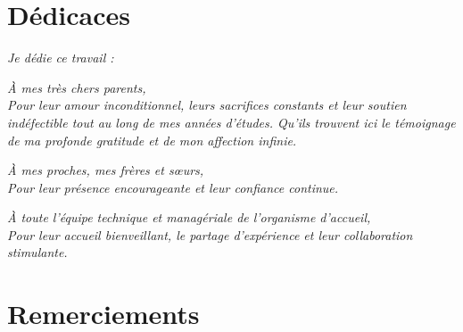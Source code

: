 
\chapter*{Dédicaces}
\thispagestyle{empty}

\begin{center}
  \large
  \textit{Je dédie ce travail :}
\end{center}

\vspace{1cm}

\begin{center}
  \textit{À mes très chers parents,}\\
  \textit{Pour leur amour inconditionnel, leurs sacrifices constants et leur soutien indéfectible tout au long de mes années d'études. Qu'ils trouvent ici le témoignage de ma profonde gratitude et de mon affection infinie.}
\end{center}

\vspace{0.5cm}

\begin{center}
  \textit{À mes proches, mes frères et sœurs,}\\
  \textit{Pour leur présence encourageante et leur confiance continue.}
\end{center}

\vspace{0.5cm}

\begin{center}
  \textit{À toute l'équipe technique et managériale de l'organisme d'accueil,}\\
  \textit{Pour leur accueil bienveillant, le partage d'expérience et leur collaboration stimulante.}
\end{center}

\vspace{1.5cm}

\nopagebreak{%
  \raggedleft\normalfont\large\itshape{} \reportAuthor\par%
}

\cleardoublepage%

\chapter*{Remerciements}
\thispagestyle{empty}

